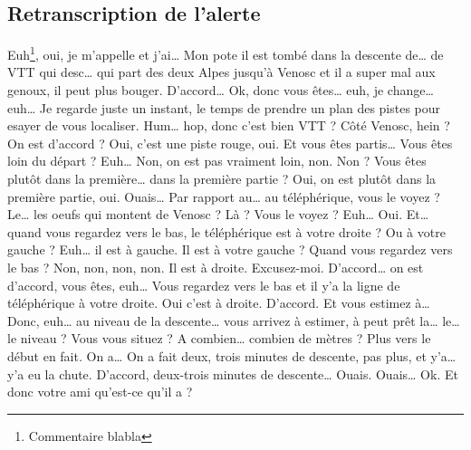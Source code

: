 \subsection{Retranscription de l'alerte}


\begin{dialogue}
\Req {} Euh\footnote{Commentaire blabla}, oui, je m'appelle  et j'ai… Mon pote il est tombé dans
la descente de… de VTT qui desc… qui part des deux Alpes jusqu'à Venosc et il a super mal aux genoux, il peut plus bouger.
\Sec D'accord… Ok, donc vous êtes… euh, je change… euh… Je regarde juste un instant, le temps de prendre un plan des pistes pour esayer de vous localiser. Hum… hop, donc c'est bien VTT ? Côté Venosc, hein ? On est d’accord ?
\Req Oui, c'est une piste rouge, oui.
\Sec Et vous êtes partis… Vous êtes loin du départ ?
\Req Euh… Non, on est pas vraiment loin, non.
\Sec Non ? Vous êtes plutôt dans la première… dans la première partie ?
\Req Oui, on est plutôt dans la première partie, oui.
\Sec Ouais… Par rapport au… au téléphérique, vous le voyez ? Le… les oeufs qui montent de Venosc ? Là ? Vous le voyez ?
\Req Euh… Oui.
\Sec Et… quand vous regardez vers le bas, le téléphérique est à votre droite ? Ou à votre gauche ?
\Req Euh… il est à gauche.
\Sec Il est à votre gauche  ? Quand vous regardez vers le bas ?
\Req Non, non, non, non. Il est à droite. Excusez-moi.
\Sec D'accord… on est d'accord, vous êtes, euh… Vous regardez vers le bas et il y'a la ligne de téléphérique à votre droite.
\Req Oui c'est à droite.
\Sec D'accord. Et vous estimez à… Donc, euh… au niveau de la descente… vous arrivez à estimer, à peut prêt la… le… le niveau ? Vous vous situez ? A combien… combien de mètres ?
\Req Plus vers le début en fait. On a… On a fait deux, trois minutes de descente, pas plus, et y'a… y'a eu la chute.
\Sec D'accord, deux-trois minutes de descente…
\Req Ouais.
\Sec Ouais… Ok. Et donc votre ami qu'est-ce qu'il a ? 
\end{dialogue}